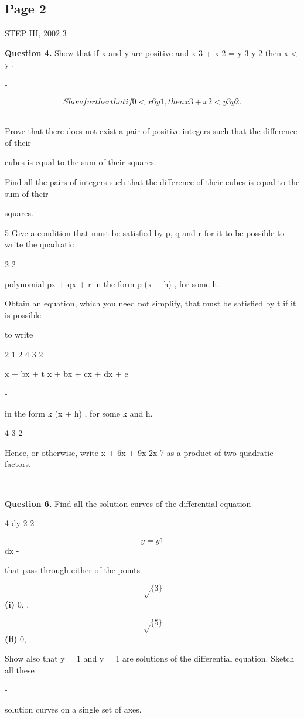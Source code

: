 \documentclass[12pt]{article}
\begin{document}
\subsection*{Page 2}
\begin{flushleft}
STEP III, 2002 3\par
\bigskip\textbf{Question 4.} Show that if x and y are positive and x 3 + x 2 = y 3 y 2 then x < y .\par
-\par
\[Show further that if 0 < x 6 y 1, then x 3 + x 2 < y 3 y 2 .\]
- -\par
Prove that there does not exist a pair of positive integers such that the difference of their\par
cubes is equal to the sum of their squares.\par
Find all the pairs of integers such that the difference of their cubes is equal to the sum of their\par
squares.\par
5 Give a condition that must be satisfied by p, q and r for it to be possible to write the quadratic\par
2 2\par
polynomial px + qx + r in the form p (x + h) , for some h.\par
Obtain an equation, which you need not simplify, that must be satisfied by t if it is possible\par
to write\par
2 1 2 4 3 2\par
x + bx + t x + bx + cx + dx + e\par
-\par
in the form k (x + h) , for some k and h.\par
4 3 2\par
Hence, or otherwise, write x + 6x + 9x 2x 7 as a product of two quadratic factors.\par
- -\par
\bigskip\textbf{Question 6.} Find all the solution curves of the differential equation\par
4 dy 2 2\par
\[y = y 1\]
\lambda dx \mu -\par
that pass through either of the points\par
\[\sqrt\{3\}\]
\textbf{(i)} 0, ,\par
\gamma \delta\par
\[\sqrt\{5\}\]
\textbf{(ii)} 0, .\par
\gamma \delta\par
Show also that y = 1 and y = 1 are solutions of the differential equation. Sketch all these\par
-\par
solution curves on a single set of axes.\par
\end{flushleft}
\end{document}
